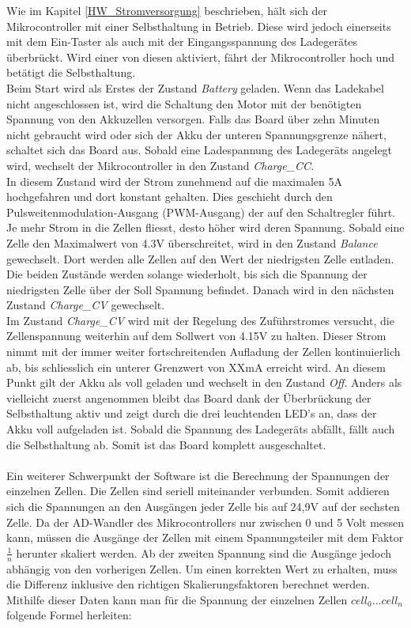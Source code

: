 Wie im Kapitel \ref{HW_Stromversorgung} beschrieben, hält sich der Mikrocontroller mit einer Selbsthaltung in Betrieb. Diese wird jedoch einerseits mit dem Ein-Taster als auch mit der Eingangsspannung des Ladegerätes überbrückt. Wird einer von diesen aktiviert, fährt der Mikrocontroller hoch und betätigt die Selbsthaltung. \\
Beim Start wird als Erstes der Zustand \textit{Battery} geladen. Wenn das Ladekabel nicht angeschlossen ist, wird die Schaltung den Motor mit der benötigten Spannung von den Akkuzellen versorgen. Falls das Board über zehn Minuten nicht gebraucht wird oder sich der Akku der unteren Spannungsgrenze nähert, schaltet sich das Board aus. Sobald eine Ladespannung des Ladegeräts angelegt wird, wechselt der Mikrocontroller in den Zustand \textit{Charge\_CC}.\\
In diesem Zustand wird der Strom zunehmend auf die maximalen 5A hochgefahren und dort konstant gehalten. Dies geschieht durch den Pulsweitenmodulation-Ausgang (PWM-Ausgang) der auf den Schaltregler führt. Je mehr Strom in die Zellen fliesst, desto höher wird deren Spannung. Sobald eine Zelle den Maximalwert von 4.3V überschreitet, wird in den Zustand \textit{Balance} gewechselt. Dort werden alle Zellen auf den Wert der niedrigsten Zelle entladen. Die beiden Zustände werden solange wiederholt, bis sich die  Spannung der niedrigsten Zelle über der Soll Spannung befindet.  Danach wird in den nächsten Zustand \textit{Charge\_CV} gewechselt. \\
Im Zustand \textit{Charge\_CV} wird mit der Regelung des Zuführstromes versucht, die Zellenspannung weiterhin auf dem Sollwert von 4.15V zu halten. Dieser Strom nimmt mit der immer weiter fortschreitenden Aufladung der Zellen kontinuierlich ab, bis schliesslich ein unterer Grenzwert von XXmA  erreicht wird. An diesem Punkt gilt der Akku als voll geladen und wechselt in den Zustand \textit{Off}.
Anders als vielleicht zuerst angenommen bleibt das Board dank der Überbrückung der Selbsthaltung aktiv und zeigt durch die drei leuchtenden LED’s an, dass der Akku voll aufgeladen ist. Sobald  die Spannung des Ladegeräts abfällt, fällt auch die Selbsthaltung ab. Somit ist das Board komplett ausgeschaltet.
\\\\
Ein weiterer Schwerpunkt der Software ist die Berechnung der Spannungen der einzelnen Zellen. Die Zellen sind seriell miteinander verbunden. Somit addieren sich die Spannungen an den Ausgängen jeder Zelle bis auf 24,9V auf der sechsten Zelle. Da der AD-Wandler des Mikrocontrollers nur zwischen 0 und 5 Volt messen kann, müssen die Ausgänge der Zellen mit einem Spannungsteiler mit dem Faktor \(\frac 1n\) herunter skaliert werden. Ab der zweiten Spannung sind die Ausgänge jedoch abhängig von den vorherigen Zellen. Um einen korrekten Wert zu erhalten, muss die Differenz inklusive den richtigen Skalierungsfaktoren berechnet werden. Mithilfe dieser Daten kann man für die Spannung der einzelnen Zellen \(cell_0 \dots cell_n\) folgende Formel herleiten:
